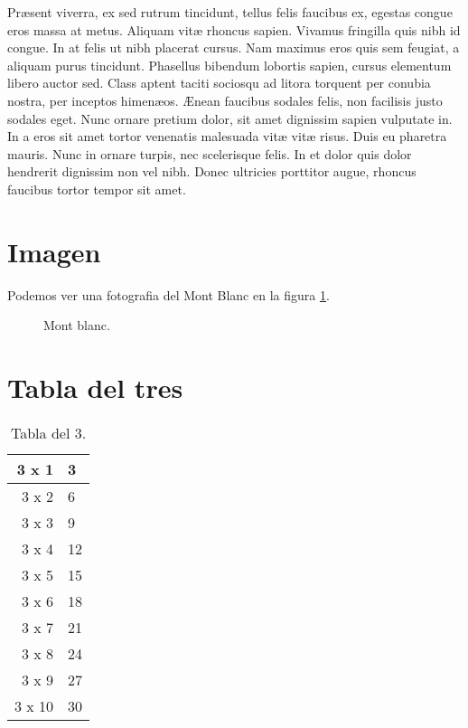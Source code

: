 \documentclass{article}
\begin{document}
Pr\ae{}sent viverra, ex sed rutrum tincidunt, tellus felis faucibus ex, egestas congue eros massa at metus. Aliquam vit\ae{} rhoncus sapien. Vivamus fringilla quis nibh id congue. In at felis ut nibh placerat cursus. Nam maximus eros quis sem feugiat, a aliquam purus tincidunt. Phasellus bibendum lobortis sapien, cursus elementum libero auctor sed. Class aptent taciti sociosqu ad litora torquent per conubia nostra, per inceptos himen\ae{}os. \AE{}nean faucibus sodales felis, non facilisis justo sodales eget. Nunc ornare pretium dolor, sit amet dignissim sapien vulputate in. In a eros sit amet tortor venenatis malesuada vit\ae{} vit\ae{} risus. Duis eu pharetra mauris. Nunc in ornare turpis, nec scelerisque felis. In et dolor quis dolor hendrerit dignissim non vel nibh. Donec ultricies porttitor augue, rhoncus faucibus tortor tempor sit amet. 

\section{Imagen}

Podemos ver una fotografia del Mont Blanc en la figura \ref{fig:montblanc}.

\begin{figure}
\caption{Mont blanc.}
\label{fig:montblanc}
\end{figure}

\section{Tabla del tres}

\begin{table}
\center
\begin{tabular}{|r|l|}
\hline
3 x 1 & 3 \\ \hline
3 x 2 & 6 \\ \hline
3 x 3 & 9 \\ \hline
3 x 4 & 12 \\ \hline
3 x 5 & 15 \\ \hline
3 x 6 & 18 \\ \hline
3 x 7 & 21 \\ \hline
3 x 8 & 24 \\ \hline
3 x 9 & 27 \\ \hline
3 x 10 & 30 \\ \hline
\end{tabular}
\caption{Tabla del 3.}
\label{tab:tabla}
\end{table}
\end{document}
